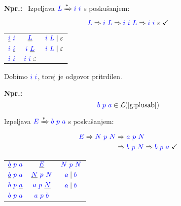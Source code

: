 \documentclass{article}
\newcommand{\Ex}{\textbf{Npr.:}\ }
\newcommand{\OK}{\ \checkmark}
\newcommand{\Symbol}[1]{\textcolor{blue}{#1}}
\newcommand{\Null}{\varepsilon}
\newcommand{\Language}[1]{\mathcal{L}(#1)}
\newcommand{\MathRef}[1]{\text{\ref{#1}}}
\newcommand{\Derive}{\Rightarrow}
\newcommand{\DeriveStar}{\xRightarrow{\ast}}
\newcommand{\Seq}{\ }
\newcommand{\Union}{\mathrel{|}}
\begin{document}
\Ex
Izpeljava $\Symbol{L} \DeriveStar \Symbol{i} \Seq \Symbol{i}$ s poskušanjem:
  \begin{equation*}
    \Symbol{L} \Derive \Symbol{i} \Seq \Symbol{L} \Derive \Symbol{i} \Seq \Symbol{i} \Seq \Symbol{L} \Derive \Symbol{i} \Seq \Symbol{i} \Seq \Null \OK
  \end{equation*}
  \begin{center}
  \begin{tabular}{|c|c|c|}
    \hline
    $\underline{\Symbol{i}} \Seq \Symbol{i}$ & $\underline{\Symbol{L}}$ & $\Symbol{i} \Seq \Symbol{L} \Union \Null$ \\ 
    $\Symbol{i} \Seq \underline{\Symbol{i}}$ & $\Symbol{i} \Seq \underline{\Symbol{L}}$ & $\Symbol{i} \Seq \Symbol{L} \Union \Null$ \\ 
    \hline
    $\Symbol{i} \Seq \Symbol{i}$ & $\Symbol{i} \Seq \Symbol{i} \Seq \Null$  &  \\ 
    \hline
  \end{tabular}
  \end{center}
  Dobimo $\Symbol{i} \Seq \Symbol{i}$, torej je odgovor pritrdilen.

\Ex
  \begin{equation*}
    \Symbol{b} \Seq \Symbol{p} \Seq \Symbol{a} \in \Language{\MathRef{g:plusab}}
  \end{equation*}

Izpeljava $\Symbol{E} \DeriveStar \Symbol{b} \Seq \Symbol{p} \Seq \Symbol{a}$ s poskušanjem:
  \begin{equation*}
    \Symbol{E} \Derive \Symbol{N} \Seq \Symbol{p} \Seq \Symbol{N} \begin{aligned}[t]
      &\Derive \Symbol{a} \Seq \Symbol{p} \Seq \Symbol{N}\\
      &\Derive \Symbol{b} \Seq \Symbol{p} \Seq \Symbol{N} \Derive \Symbol{b} \Seq \Symbol{p} \Seq \Symbol{a} \OK
    \end{aligned}
  \end{equation*}

\begin{center}
\begin{tabular}{|c|c|c|}
  \hline
  $\underline{\Symbol{b}} \Seq \Symbol{p} \Seq \Symbol{a}$ & $\underline{\Symbol{E}}$ & $\Symbol{N} \Seq \Symbol{p} \Seq \Symbol{N}$ \\ 
  $\underline{\Symbol{b}} \Seq \Symbol{p} \Seq \Symbol{a}$ & $\underline{\Symbol{N}} \Seq \Symbol{p} \Seq \Symbol{N}$ & $\Symbol{a} \Union \Symbol{b}$ \\ 
  $\Symbol{b} \Seq \Symbol{p} \Seq \underline{\Symbol{a}}$ & $\Symbol{a} \Seq \Symbol{p} \Seq \underline{\Symbol{N}}$ & $\Symbol{a} \Union \Symbol{b}$ \\ 
  \hline
  $\Symbol{b} \Seq \Symbol{p} \Seq \Symbol{a}$ & $\Symbol{a} \Seq \Symbol{p} \Seq \Symbol{b}$ &  \\ 
  \hline
\end{tabular}
\end{center}
\end{document}
